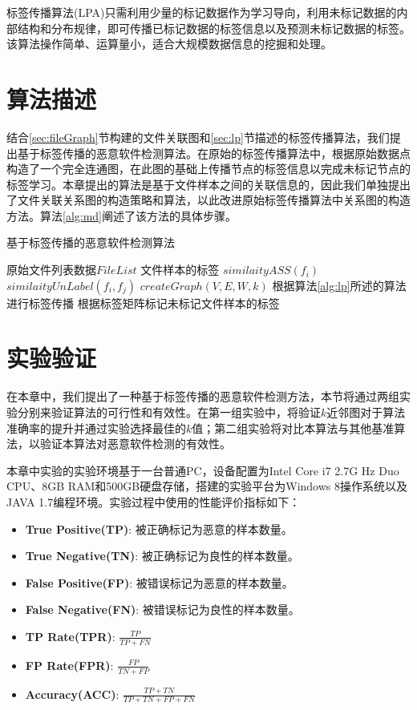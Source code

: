 标签传播算法(LPA)只需利用少量的标记数据作为学习导向，利用未标记数据的内部结构和分布规律，即可传播已标记数据的标签信息以及预测未标记数据的标签。该算法操作简单、运算量小，适合大规模数据信息的挖掘和处理。

\section{算法描述}
结合\ref{sec:fileGraph}节构建的文件关联图和\ref{sec:lp}节描述的标签传播算法，我们提出基于标签传播的恶意软件检测算法。在原始的标签传播算法中，根据原始数据点构造了一个完全连通图，在此图的基础上传播节点的标签信息以完成未标记节点的标签学习。本章提出的算法是基于文件样本之间的关联信息的，因此我们单独提出了文件关联关系图的构造策略和算法，以此改进原始标签传播算法中关系图的构造方法。算法\ref{alg:md}阐述了该方法的具体步骤。

\begin{algorithm}
\caption{基于标签传播的恶意软件检测算法}
\label{alg:md}
\begin{algorithmic}[1]
\Input 原始文件列表数据$FileList$
\Output 文件样本的标签
\State $similaityASS(f_{i})$
\EndFor
{}
\State $similaityUnLabel(f_{i},f_{j})$
\EndIf
\EndFor
\EndFor
\State $createGraph(V,E,W,k)$
\State 根据算法\ref{alg:lp}所述的算法进行标签传播
\State 根据标签矩阵标记未标记文件样本的标签
\end{algorithmic}
\end{algorithm}


\section{实验验证}
在本章中，我们提出了一种基于标签传播的恶意软件检测方法，本节将通过两组实验分别来验证算法的可行性和有效性。在第一组实验中，将验证$k$近邻图对于算法准确率的提升并通过实验选择最佳的$k$值；第二组实验将对比本算法与其他基准算法，以验证本算法对恶意软件检测的有效性。

本章中实验的实验环境基于一台普通PC，设备配置为Intel Core i7 2.7G Hz Duo CPU、8GB RAM和500GB硬盘存储，搭建的实验平台为Windows 8操作系统以及JAVA 1.7编程环境。实验过程中使用的性能评价指标如下：
\begin{itemize}
\item \textbf{True Positive(TP)}: 被正确标记为恶意的样本数量。
\item \textbf{True Negative(TN)}: 被正确标记为良性的样本数量。
\item \textbf{False Positive(FP)}: 被错误标记为恶意的样本数量。
\item \textbf{False Negative(FN)}: 被错误标记为良性的样本数量。
\item \textbf{TP Rate(TPR)}: $\frac {TP} {TP+FN}$
\item \textbf{FP Rate(FPR)}: $\frac {FP} {TN+FP}$
\item \textbf{Accuracy(ACC)}: $\frac {TP+TN} {TP+TN+FP+FN}$
\end{itemize}


